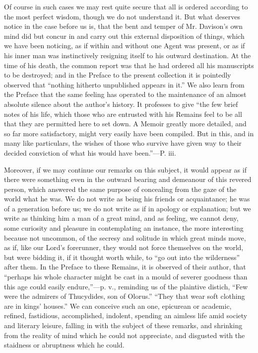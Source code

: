 Of course in such cases we may rest quite secure
that all is ordered according to the most perfect wisdom, though we do
not understand it. But what deserves notice in the case before us is,
that the bent and temper of Mr. Davison's own mind did but concur in
and carry out this external disposition of things, which we have been
noticing, as if within and without one Agent was present, or as if his
inner man was instinctively resigning itself to his outward
destination. At the time of his death, the common report was that he
had ordered all his manuscripts to be destroyed; and in the Preface to
the present collection it is pointedly observed that ``nothing hitherto
unpublished appears in it.'' We also learn from the Preface that the
same feeling has operated to the maintenance of an almost absolute
silence about the author's history. It professes to give ``the few
brief notes of his life, which those who are entrusted with his
Remains feel to be all that they are permitted here to set down. A
Memoir greatly more detailed, and so far more satisfactory,
might very easily have been compiled. But in this, and in many like
particulars, the wishes of those who survive have given way to their
decided conviction of what his would have been.''—P. iii.

Moreover, if we may continue our remarks on this
subject, it would appear as if there were something even in the
outward bearing and demeanour of this revered person, which answered
the same purpose of concealing from the gaze of the world what he was.
We do not write as being his friends or acquaintance; he was of a
generation before us; we do not write as if in apology or explanation;
but we write as thinking him a man of a great mind, and as feeling, we
cannot deny, some curiosity and pleasure in contemplating an instance,
the more interesting because not uncommon, of the secresy and solitude
in which great minds move, as if, like our Lord's forerunner, they
would not force themselves on the world, but were bidding it, if it
thought worth while, to ``go out into the wilderness'' after them. In
the Preface to these Remains, it is observed of their author, that ``perhaps
his whole character might be cast in a mould of severer goodness than
this age could easily endure,''—p. v., reminding us of the plaintive
distich, ``Few were the admirers of Thucydides, son of Olorus.'' ``They
that wear soft clothing are in kings' houses.'' We can conceive such an
one, epicurean or academic, refined, fastidious, accomplished,
indolent, spending an aimless life amid society and literary leisure,
falling in with the subject of these remarks, and shrinking from the
reality of mind which he could not appreciate, and disgusted with the
staidness or abruptness which he could.

